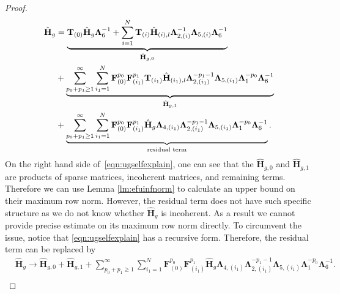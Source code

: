 \documentclass[twoside,11pt]{article}
\newcommand{\matF}{\mathbf{F}}
\newcommand{\hmatH}{{\hat{\mathbf{H}}}{}}
\newcommand{\matT}{\mathbf{T}}
\newcommand{\matLambda}{\mathbf{\Lambda}}
\begin{document}
\begin{proof}
\begin{align}
\hmatH_{g}&=\underbrace{\matT_{(0)}\hmatH_g\matLambda_6^{-1} +\sum_{i=1}^N\matT_{(i)}\hmatH_{(i),l}\matLambda_{2,(i)}^{-1}\matLambda_{5,(i)}\matLambda_{6}^{-1}}_{\hmatH_{g,0}}\notag\\
&+\underbrace{\sum_{p_0+p_1\ge 1}^{\infty}\sum_{i_1=1}^N\matF_{(0)}^{p_0}\matF_{(i_1)}^{p_1}\matT_{(i_1)}\hmatH_{(i_1),l}\matLambda_{2,(i_1)}^{-p_1-1}\matLambda_{5,(i_1)}\matLambda_{1}^{-p_0}\matLambda_6^{-1}}_{\hmatH_{g,1}}\notag\\
&+\underbrace{\sum_{p_0+p_1\ge 1}^{\infty}\sum_{i_1=1}^N\matF_{(0)}^{p_0}\matF_{(i_1)}^{p_1}\hmatH_{g}\matLambda_{4,(i_1)}\matLambda_{2,(i_1)}^{-p_1-1}\matLambda_{5,(i_1)}\matLambda_{1}^{-p_0}\matLambda_6^{-1}}_{\text{residual term}}.\notag\\
\label{eqn:ugselfexplain}
\end{align}
On the right hand side of~\eqref{eqn:ugselfexplain}, one can see that the $\hmatH_{g,0}$ and $\hmatH_{g,1}$ are products of sparse matrices, incoherent matrices, and remaining terms. Therefore we can use Lemma \ref{lm:efuinfnorm} to calculate an upper bound on their maximum row norm. However, the residual term does not have such specific structure as we do not know whether $\hmatH_g$ is incoherent. As a result we cannot provide precise estimate on its maximum row norm directly. To circumvent the issue, notice that \eqref{eqn:ugselfexplain} has a recursive form. Therefore, the residual term can be replaced by
\begin{equation}
\label{eqn:replacementrule}
\begin{aligned}
&\hmatH_{g}\to \hmatH_{g,0}+\hmatH_{g,1}+\sum_{p_0+p_1\ge 1}^{\infty}\sum_{i_1=1}^N\matF_{(0)}^{p_0}\matF_{(i_1)}^{p_1}\hmatH_{g}\matLambda_{4,(i_1)}\matLambda_{2,(i_1)}^{-p_1-1}\matLambda_{5,(i_1)}\matLambda_{1}^{-p_0}\matLambda_6^{-1}.\\
\end{aligned}
\end{equation}


\end{proof}
\end{document}
